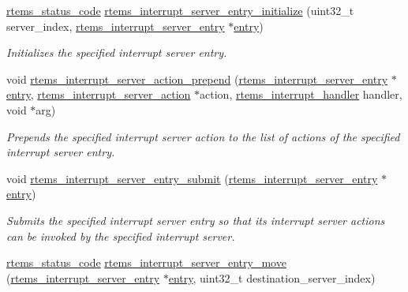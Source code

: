 \begin{DoxyCompactItemize}
\mbox{\hyperlink{group__ClassicStatus_ga545d41846817eaba6143d52ee4d9e9fe}{rtems\+\_\+status\+\_\+code}} \mbox{\hyperlink{group__rtems__interrupt__extension_ga86ea2e100b06ad64fa320381bb34d2d1}{rtems\+\_\+interrupt\+\_\+server\+\_\+entry\+\_\+initialize}} (uint32\+\_\+t server\+\_\+index, \mbox{\hyperlink{structrtems__interrupt__server__entry}{rtems\+\_\+interrupt\+\_\+server\+\_\+entry}} $\ast$\mbox{\hyperlink{structentry}{entry}})
\begin{DoxyCompactList}\small\item\em Initializes the specified interrupt server entry. \end{DoxyCompactList}\item 
void \mbox{\hyperlink{group__rtems__interrupt__extension_ga734c36a08deae3d40775f46e526526be}{rtems\+\_\+interrupt\+\_\+server\+\_\+action\+\_\+prepend}} (\mbox{\hyperlink{structrtems__interrupt__server__entry}{rtems\+\_\+interrupt\+\_\+server\+\_\+entry}} $\ast$\mbox{\hyperlink{structentry}{entry}}, \mbox{\hyperlink{structrtems__interrupt__server__action}{rtems\+\_\+interrupt\+\_\+server\+\_\+action}} $\ast$action, \mbox{\hyperlink{group__rtems__interrupt__extension_gab39bd096ab2c3b41d03dace0e9777b08}{rtems\+\_\+interrupt\+\_\+handler}} handler, void $\ast$arg)
\begin{DoxyCompactList}\small\item\em Prepends the specified interrupt server action to the list of actions of the specified interrupt server entry. \end{DoxyCompactList}\item 
void \mbox{\hyperlink{group__rtems__interrupt__extension_ga9fd697f72b1ab860a3ebb548fab5929f}{rtems\+\_\+interrupt\+\_\+server\+\_\+entry\+\_\+submit}} (\mbox{\hyperlink{structrtems__interrupt__server__entry}{rtems\+\_\+interrupt\+\_\+server\+\_\+entry}} $\ast$\mbox{\hyperlink{structentry}{entry}})
\begin{DoxyCompactList}\small\item\em Submits the specified interrupt server entry so that its interrupt server actions can be invoked by the specified interrupt server. \end{DoxyCompactList}\item 
\mbox{\hyperlink{group__ClassicStatus_ga545d41846817eaba6143d52ee4d9e9fe}{rtems\+\_\+status\+\_\+code}} \mbox{\hyperlink{group__rtems__interrupt__extension_gaa7023165766039522b7d4572f6335c3e}{rtems\+\_\+interrupt\+\_\+server\+\_\+entry\+\_\+move}} (\mbox{\hyperlink{structrtems__interrupt__server__entry}{rtems\+\_\+interrupt\+\_\+server\+\_\+entry}} $\ast$\mbox{\hyperlink{structentry}{entry}}, uint32\+\_\+t destination\+\_\+server\+\_\+index)

\end{DoxyCompactItemize}
